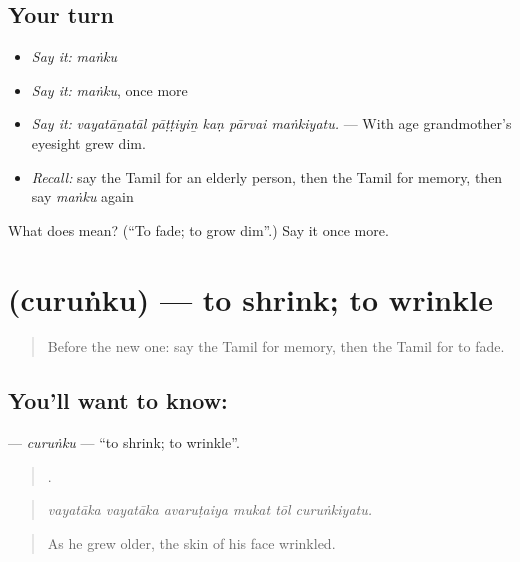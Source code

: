 \subsection*{Your turn}
\begin{itemize}
\raggedright
  \item \emph{Say it:} \emph{maṅku}
  \item \emph{Say it:} \emph{maṅku}, once more
  \item \emph{Say it:} \emph{vayatāṉatāl pāṭṭiyiṉ kaṇ pārvai maṅkiyatu.} — With age grandmother’s eyesight grew dim.
  \item \emph{Recall:} say the Tamil for an elderly person, then the Tamil for memory, then say \emph{maṅku} again
\end{itemize}

\begin{tcolorbox}[breakable,colback=teal!4,colframe=teal!35!black,title={Before you move on}]
What does  mean? (\textquotedblleft{}To fade; to grow dim\textquotedblright{}.) Say it once more.
\end{tcolorbox}
\section[\texorpdfstring{\ta{சுருங்கு} (curuṅku)}{சுருங்கு (curuṅku)}]{ (curuṅku) — to shrink; to wrinkle}

\label{lesson:TA-C504-curunku}



\begin{quote}
Before the new one: say the Tamil for memory, then the Tamil for to fade.
\end{quote}

\subsection*{You'll want to know: }
\textbf{} — \emph{curuṅku} — \textquotedblleft{}to shrink; to wrinkle\textquotedblright{}.

\begin{quote}
     .
\end{quote}

\begin{quote}
\emph{vayatāka vayatāka avaruṭaiya mukat tōl curuṅkiyatu.}
\end{quote}

\begin{quote}
As he grew older, the skin of his face wrinkled.
\end{quote}

